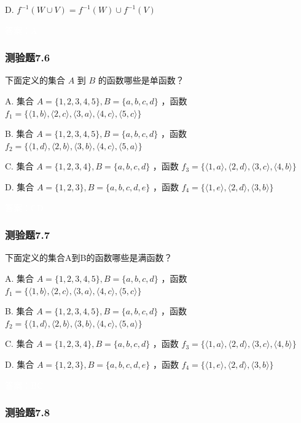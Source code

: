 \documentclass[UTF8, heading=true]{ctexart}
\begin{document}
D. $f^{-1}(W \cup V)=f^{-1}(W) \cup f^{-1}(V)$

\textcolor{white}{答案：A}


\subsubsection{测验题7.6}

下面定义的集合 $A$ 到 $B$ 的函数哪些是单函数？

A. 集合 $A=\{1,2,3,4,5\}, B=\{a, b, c, d\}$ ，函数 $f_1=\{\langle 1, b\rangle,\langle 2, c\rangle,\langle 3, a\rangle,\langle 4, c\rangle,\langle 5, c\rangle\}$

B. 集合 $A=\{1,2,3,4,5\}, B=\{a, b, c, d\}$ ，函数 $f_2=\{\langle 1, d\rangle,\langle 2, b\rangle,\langle 3, b\rangle,\langle 4, c\rangle,\langle 5, a\rangle\}$

C. 集合 $A=\{1,2,3,4\}, B=\{a, b, c, d\}$ ，函数 $f_3=\{\langle 1, a\rangle,\langle 2, d\rangle,\langle 3, c\rangle,\langle 4, b\rangle\}$

D. 集合 $A=\{1,2,3\}, B=\{a, b, c, d, e\}$ ，函数 $f_4=\{\langle 1, e\rangle,\langle 2, d\rangle,\langle 3, b\rangle\}$

\textcolor{white}{答案：CD}

\subsubsection{测验题7.7}

下面定义的集合A到B的函数哪些是满函数？

A. 集合 $A=\{1,2,3,4,5\}, B=\{a, b, c, d\}$ ，函数 $f_1=\{\langle 1, b\rangle,\langle 2, c\rangle,\langle 3, a\rangle,\langle 4, c\rangle,\langle 5, c\rangle\}$

B. 集合 $A=\{1,2,3,4,5\}, B=\{a, b, c, d\}$ ，函数 $f_2=\{\langle 1, d\rangle,\langle 2, b\rangle,\langle 3, b\rangle,\langle 4, c\rangle,\langle 5, a\rangle\}$

C. 集合 $A=\{1,2,3,4\}, B=\{a, b, c, d\}$ ，函数 $f_3=\{\langle 1, a\rangle,\langle 2, d\rangle,\langle 3, c\rangle,\langle 4, b\rangle\}$

D.  集合 $A=\{1,2,3\}, B=\{a, b, c, d, e\}$ ，函数 $f_4=\{\langle 1, e\rangle,\langle 2, d\rangle,\langle 3, b\rangle\}$


\textcolor{white}{答案：BC}

\subsubsection{测验题7.8}
\end{document}
